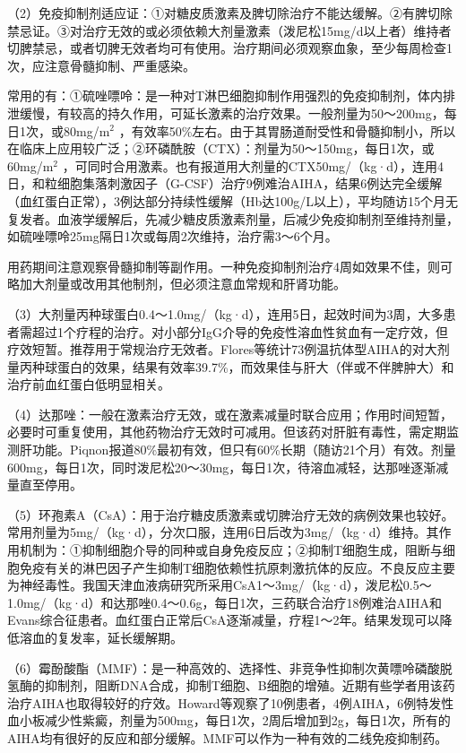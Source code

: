 （2）免疫抑制剂适应证：①对糖皮质激素及脾切除治疗不能达缓解。②有脾切除禁忌证。③对治疗无效的或必须依赖大剂量激素（泼尼松15mg/d以上者）维持者切脾禁忌，或者切脾无效者均可有使用。治疗期间必须观察血象，至少每周检查1次，应注意骨髓抑制、严重感染。

常用的有：①硫唑嘌呤：是一种对T淋巴细胞抑制作用强烈的免疫抑制剂，体内排泄缓慢，有较高的持久作用，可延长激素的治疗效果。一般剂量为50～200mg，每日1次，或80mg/m$^2$
，有效率50\%左右。由于其胃肠道耐受性和骨髓抑制小，所以在临床上应用较广泛；②环磷酰胺（CTX）：剂量为50～150mg，每日1次，或60mg/m$^2$
，可同时合用激素。也有报道用大剂量的CTX50mg/（kg·d），连用4日，和粒细胞集落刺激因子（G-CSF）治疗9例难治AIHA，结果6例达完全缓解（血红蛋白正常），3例达部分持续性缓解（Hb达100g/L以上），平均随访15个月无复发者。血液学缓解后，先减少糖皮质激素剂量，后减少免疫抑制剂至维持剂量，如硫唑嘌呤25mg隔日1次或每周2次维持，治疗需3～6个月。

用药期间注意观察骨髓抑制等副作用。一种免疫抑制剂治疗4周如效果不佳，则可略加大剂量或改用其他制剂，但必须注意血常规和肝肾功能。

（3）大剂量丙种球蛋白0.4～1.0mg/（kg·d），连用5日，起效时间为3周，大多患者需超过1个疗程的治疗。对小部分IgG介导的免疫性溶血性贫血有一定疗效，但疗效短暂。推荐用于常规治疗无效者。Flores等统计73例温抗体型AIHA的对大剂量丙种球蛋白的效果，结果有效率39.7\%，而效果佳与肝大（伴或不伴脾肿大）和治疗前血红蛋白低明显相关。

（4）达那唑：一般在激素治疗无效，或在激素减量时联合应用；作用时间短暂，必要时可重复使用，其他药物治疗无效时可减用。但该药对肝脏有毒性，需定期监测肝功能。Piqnon报道80\%最初有效，但只有60\%长期（随访21个月）有效。剂量600mg，每日1次，同时泼尼松20～30mg，每日1次，待溶血减轻，达那唑逐渐减量直至停用。

（5）环孢素A（CsA）：用于治疗糖皮质激素或切脾治疗无效的病例效果也较好。常用剂量为5mg/（kg·d），分次口服，连用6日后改为3mg/（kg·d）维持。其作用机制为：①抑制细胞介导的同种或自身免疫反应；②抑制T细胞生成，阻断与细胞免疫有关的淋巴因子产生抑制T细胞依赖性抗原刺激抗体的反应。不良反应主要为神经毒性。我国天津血液病研究所采用CsA1～3mg/（kg·d），泼尼松0.5～1.0mg/（kg·d）和达那唑0.4～0.6g，每日1次，三药联合治疗18例难治AIHA和Evans综合征患者。血红蛋白正常后CsA逐渐减量，疗程1～2年。结果发现可以降低溶血的复发率，延长缓解期。

（6）霉酚酸酯（MMF）：是一种高效的、选择性、非竞争性抑制次黄嘌呤磷酸脱氢酶的抑制剂，阻断DNA合成，抑制T细胞、B细胞的增殖。近期有些学者用该药治疗AIHA也取得较好的疗效。Howard等观察了10例患者，4例AIHA，6例特发性血小板减少性紫癜，剂量为500mg，每日1次，2周后增加到2g，每日1次，所有的AIHA均有很好的反应和部分缓解。MMF可以作为一种有效的二线免疫抑制药。

